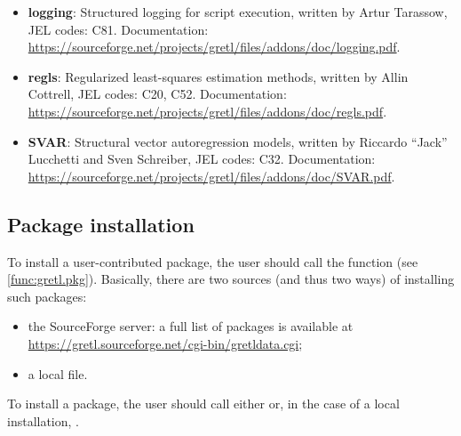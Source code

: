 \begin{itemize}
		Documentation: \url{https://sourceforge.net/projects/gretl/files/addons/doc/KFgui.txt}.	
	\item \textbf{logging}: Structured logging for script execution,
		written by Artur Tarassow, JEL codes: C81.\newline
		Documentation: \url{https://sourceforge.net/projects/gretl/files/addons/doc/logging.pdf}.	
	\item \textbf{regls}: Regularized least-squares estimation
		methods, written by Allin Cottrell, JEL codes: C20, C52.\newline
		Documentation: \url{https://sourceforge.net/projects/gretl/files/addons/doc/regls.pdf}.	
	\item \textbf{SVAR}: Structural vector autoregression models,
		written by Riccardo ``Jack'' Lucchetti and Sven Schreiber,
		JEL codes: C32.\newline
		Documentation: \url{https://sourceforge.net/projects/gretl/files/addons/doc/SVAR.pdf}.
\end{itemize}


\subsection{Package installation}
To install a user-contributed package, the user should call the
 function (see \ref{func:gretl.pkg}). Basically,
there are two sources (and thus two ways) of installing such packages:
\begin{itemize}
	\item the SourceForge server: a full list of packages is available
		at \url{https://gretl.sourceforge.net/cgi-bin/gretldata.cgi};
	\item a local file.
\end{itemize}
To install a package, the user should call either
or, in the case of a local installation,
.

